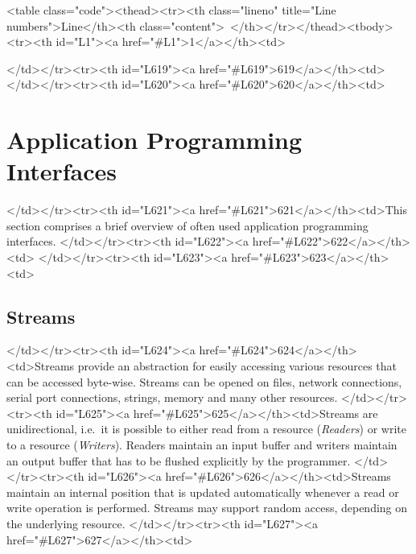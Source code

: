 <table class="code"><thead><tr><th class="lineno" title="Line numbers">Line</th><th class="content"> </th></tr></thead><tbody><tr><th id="L1"><a href="#L1">1</a></th><td>\documentclass[a4paper,11pt]{article}
\begin{document}
</td></tr><tr><th id="L619"><a href="#L619">619</a></th><td>
</td></tr><tr><th id="L620"><a href="#L620">620</a></th><td>\section{Application Programming Interfaces}
</td></tr><tr><th id="L621"><a href="#L621">621</a></th><td>This section comprises a brief overview of often used application programming interfaces.
</td></tr><tr><th id="L622"><a href="#L622">622</a></th><td>
</td></tr><tr><th id="L623"><a href="#L623">623</a></th><td>\subsection{Streams}
</td></tr><tr><th id="L624"><a href="#L624">624</a></th><td>Streams provide an abstraction for easily accessing various resources that can be accessed byte-wise. Streams can be opened on files, network connections, serial port connections, strings, memory and many other resources.
</td></tr><tr><th id="L625"><a href="#L625">625</a></th><td>Streams are unidirectional, i.e.\ it is possible to either read from a resource (\emph{Readers}) or write to a resource (\emph{Writers}). Readers maintain an input buffer and writers maintain an output buffer that has to be flushed explicitly by the programmer.
</td></tr><tr><th id="L626"><a href="#L626">626</a></th><td>Streams maintain an internal position that is updated automatically whenever a read or write operation is performed. Streams may support random access, depending on the underlying resource.
</td></tr><tr><th id="L627"><a href="#L627">627</a></th><td>
\end{document}
